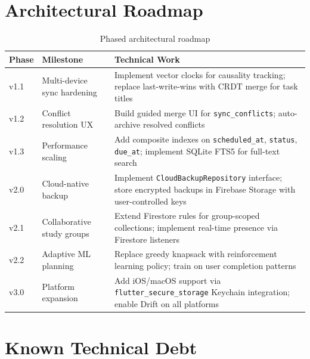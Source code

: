 \documentclass[12pt,a4paper,openany]{report}
\begin{document}
\section{Architectural Roadmap}

\begin{table}[H]
\centering
\caption{Phased architectural roadmap}
\label{tab:roadmap}
\begin{tabular}{llp{8cm}}
\toprule
\textbf{Phase} & \textbf{Milestone} & \textbf{Technical Work} \\
\midrule
v1.1 & Multi-device sync hardening & Implement vector clocks for causality tracking; replace last-write-wins with CRDT merge for task titles \\
v1.2 & Conflict resolution UX & Build guided merge UI for \texttt{sync\_conflicts}; auto-archive resolved conflicts \\
v1.3 & Performance scaling & Add composite indexes on \texttt{scheduled\_at}, \texttt{status}, \texttt{due\_at}; implement SQLite FTS5 for full-text search \\
v2.0 & Cloud-native backup & Implement \texttt{CloudBackupRepository} interface; store encrypted backups in Firebase Storage with user-controlled keys \\
v2.1 & Collaborative study groups & Extend Firestore rules for group-scoped collections; implement real-time presence via Firestore listeners \\
v2.2 & Adaptive ML planning & Replace greedy knapsack with reinforcement learning policy; train on user completion patterns \\
v3.0 & Platform expansion & Add iOS/macOS support via \texttt{flutter\_secure\_storage} Keychain integration; enable Drift on all platforms \\
\bottomrule
\end{tabular}
\end{table}

\section{Known Technical Debt}
\end{document}
